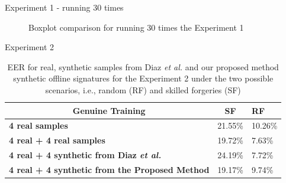 \documentclass{beamer}
\begin{document}
\begin{frame}{Experiment 1 - running 30 times}
\begin{figure}[!htb]
\caption{Boxplot comparison for running 30 times the Experiment 1}
\end{figure}
\end{frame}

\begin{frame}{Experiment 2}

\begin{table}[!htb]
    \renewcommand{\arraystretch}{1.3}
    \caption{EER for real, synthetic samples from Diaz \textit{et al.} \cite{diaz2014generation} and our proposed method synthetic offline signatures for the Experiment 2 under the two possible scenarios, i.e., random (RF) and skilled forgeries (SF)}
    \label{exp2_results_table}
    \centering
    \begin{tabular}{|l|l|l|}
        \hline
        \multicolumn{1}{|c|}{\textbf{Genuine Training}} & \multicolumn{1}{c|}{\textbf{SF}} & \textbf{RF} \\ \hline
        \textbf{4 real samples}                                         & 21.55\%                     & 10.26\%                         \\ \hline
        \textbf{4 real + 4 real samples}                       & 19.72\%                      & 7.63\%                        \\ \hline
        \textbf{4 real + 4 synthetic from Diaz \textit{et al.}}                           & 24.19\%                         & 7.72\%                \\ \hline
        \textbf{4 real + 4 synthetic from the Proposed Method}                           & 19.17\%         & 9.74\%                        \\ \hline
    \end{tabular}

\end{table}
\end{frame}
\end{document}
